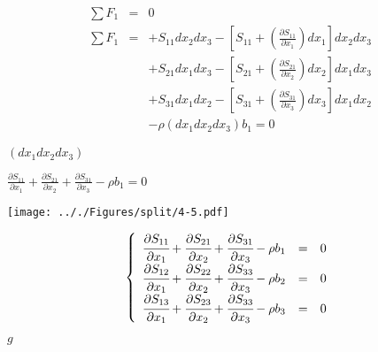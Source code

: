 \documentclass[onecolumn,11pt]{report}
\def\lthtmlcheckvsize{\ifdim\ht\sizebox<\vsize 
  \ifdim\wd\sizebox<\hsize\expandafter\hfill\fi \expandafter\vfill
  \else\expandafter\vss\fi}%
\begin{document}
{\newpage\clearpage
{}%
\begin{displaymath}\begin{array}{rcl}
\sum F_1 & = & 0 \\
\sum F_1 & =
& + S_{11} dx_2 dx_3 - \left[ S_{11} + (\frac{\partial S_{11}}{\partial x_1}) dx_1 \right] dx_2 dx_3 \\
& & + S_{21} dx_1 dx_3 - \left[ S_{21} + (\frac{\partial S_{21}}{\partial x_2}) dx_2 \right] dx_1 dx_3 \\
& & + S_{31} dx_1 dx_2 - \left[ S_{31} + (\frac{\partial S_{31}}{\partial x_3}) dx_3 \right] dx_1 dx_2 \\
& & - \rho (dx_1 dx_2 dx_3) b_1 = 0
\end{array}\end{displaymath}%
\lthtmldisplayZ
\lthtmlcheckvsize\clearpage}

{\newpage\clearpage
{}%
$ (dx_1 dx_2 dx_3)$%
\lthtmlindisplaymathZ
\lthtmlcheckvsize\clearpage}

{\newpage\clearpage
{}%
$\displaystyle \frac{\partial S_{11}}{\partial x_1} +
\frac{\partial S_{21}}{\partial x_2} +
\frac{\partial S_{31}}{\partial x_3} -
\rho b_1 = 0$%
\lthtmlindisplaymathZ
\lthtmlcheckvsize\clearpage}

{\newpage\clearpage
{}%
\texttt{[image: .././Figures/split/4-5.pdf]}%
\lthtmlpictureZ
\lthtmlcheckvsize\clearpage}

{\newpage\clearpage
{}%
\begin{displaymath}\displaystyle
\left\lbrace
\begin{array}{rcl}
\cfrac{\partial S_{11}}{\partial x_1} +
\cfrac{\partial S_{21}}{\partial x_2} +
\cfrac{\partial S_{31}}{\partial x_3} -
\rho b_1 & = & 0 \\
\cfrac{\partial S_{12}}{\partial x_1} +
\cfrac{\partial S_{22}}{\partial x_2} +
\cfrac{\partial S_{33}}{\partial x_3} -
\rho b_2 & = & 0 \\
\cfrac{\partial S_{13}}{\partial x_1} +
\cfrac{\partial S_{23}}{\partial x_2} +
\cfrac{\partial S_{33}}{\partial x_3} -
\rho b_3 & = & 0 \\
\end{array}
\right.\end{displaymath}%
\lthtmldisplayZ
\lthtmlcheckvsize\clearpage}

{\newpage\clearpage
{}%
$ g$%
\lthtmlindisplaymathZ
\lthtmlcheckvsize\clearpage}
\end{document}
